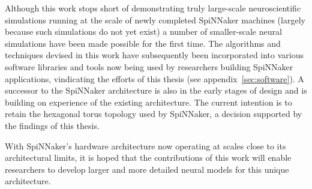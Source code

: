 		
		Although this work stops short of demonstrating truly large-scale
		neuroscientific simulations running at the scale of newly completed
		SpiNNaker machines (largely because such simulations do not yet exist) a
		number of smaller-scale neural simulations have been made possible for the
		first time. The algorithms and techniques devised in this work have
		subsequently been incorporated into various software libraries and tools
		now being used by researchers building SpiNNaker applications, vindicating
		the efforts of this thesis (see appendix~\ref{sec:software}). A successor
		to the SpiNNaker architecture is also in the early stages of design and is
		building on experience of the existing architecture. The current intention
		is to retain the hexagonal torus topology used by SpiNNaker, a decision
		supported by the findings of this thesis.
		
		With SpiNNaker's hardware architecture now operating at scales close to its
		architectural limits, it is hoped that the contributions of this work will
		enable researchers to develop larger and more detailed neural models for
		this unique architecture.
